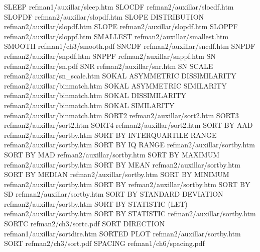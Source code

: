 SLEEP                                   refman1/auxillar/sleep.htm
SLOCDF                                  refman2/auxillar/slocdf.htm
SLOPDF                                  refman2/auxillar/slopdf.htm
SLOPE DISTRIBUTION                      refman2/auxillar/slopdf.htm
SLOPE                                   refman2/auxillar/slopdf.htm
SLOPPF                                  refman2/auxillar/sloppf.htm
SMALLEST                                refman2/auxillar/smallest.htm
SMOOTH                                  refman1/ch3/smooth.pdf
SNCDF                                   refman2/auxillar/sncdf.htm
SNPDF                                   refman2/auxillar/snpdf.htm
SNPPF                                   refman2/auxillar/snppf.htm
SN                                      refman2/auxillar/sn.pdf
SNR                                     refman2/auxillar/snr.htm
SN SCALE                                refman2/auxillar/sn_scale.htm
SOKAL ASYMMETRIC DISSIMILARITY          refman2/auxillar/binmatch.htm
SOKAL ASYMMETRIC SIMILARITY             refman2/auxillar/binmatch.htm
SOKAL DISSIMILARITY                     refman2/auxillar/binmatch.htm
SOKAL SIMILARITY                        refman2/auxillar/binmatch.htm
SORT2                                   refman2/auxillar/sort2.htm
SORT3                                   refman2/auxillar/sort2.htm
SORT4                                   refman2/auxillar/sort2.htm
SORT BY AAD                             refman2/auxillar/sortby.htm
SORT BY INTERQUARTILE RANGE             refman2/auxillar/sortby.htm
SORT BY IQ RANGE                        refman2/auxillar/sortby.htm
SORT BY MAD                             refman2/auxillar/sortby.htm
SORT BY MAXIMUM                         refman2/auxillar/sortby.htm
SORT BY MEAN                            refman2/auxillar/sortby.htm
SORT BY MEDIAN                          refman2/auxillar/sortby.htm
SORT BY MINIMUM                         refman2/auxillar/sortby.htm
SORT BY                                 refman2/auxillar/sortby.htm
SORT BY SD                              refman2/auxillar/sortby.htm
SORT BY STANDARD DEVIATION              refman2/auxillar/sortby.htm
SORT BY STATISTIC (LET)                 refman2/auxillar/sortby.htm
SORT BY STATISTIC                       refman2/auxillar/sortby.htm
SORTC                                   refman2/ch3/sortc.pdf
SORT DIRECTION                          refman1/auxillar/sortdire.htm
SORTED PLOT                             refman2/auxillar/sortby.htm
SORT                                    refman2/ch3/sort.pdf
SPACING                                 refman1/ch6/spacing.pdf
